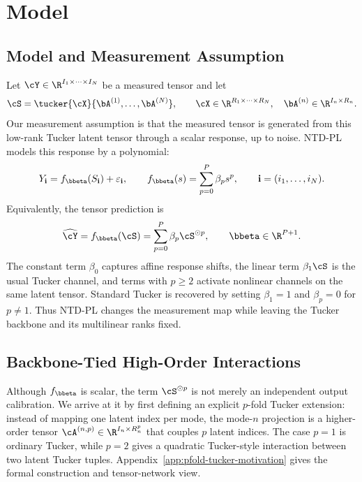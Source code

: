 \section{Model}
\label{sec:model}

\subsection{Model and Measurement Assumption}

Let \(\cY \in \R^{I_1 \times \cdots \times I_N}\) be a measured tensor and let
\begin{equation}
  \cS =
  \tucker{\cX}{\bA^{(1)}, \ldots, \bA^{(N)}},
  \qquad
  \cX \in \R^{R_1 \times \cdots \times R_N},
  \quad
  \bA^{(n)} \in \R^{I_n \times R_n}.
\end{equation}
Our measurement assumption is that the measured tensor is generated from this
low-rank Tucker latent tensor through a scalar response, up to noise. NTD-PL
models this response by a polynomial:
\begin{equation}
  Y_{\mathbf i}
  =
  f_{\bbeta}(S_{\mathbf i})+\varepsilon_{\mathbf i},
  \qquad
  f_{\bbeta}(s)=\sum_{p=0}^{P}\beta_p s^p,
  \qquad
  \mathbf i=(i_1,\ldots,i_N).
\end{equation}
Equivalently, the tensor prediction is
\begin{equation}
  \widehat{\cY}
  =
  f_{\bbeta}(\cS)
  =
  \sum_{p=0}^{P} \beta_p \cS^{\odot p},
  \qquad
  \bbeta \in \R^{P+1}.
\end{equation}
The constant term \(\beta_0\) captures affine response shifts, the linear term
\(\beta_1\cS\) is the usual Tucker channel, and terms with \(p\ge2\) activate
nonlinear channels on the same latent tensor. Standard Tucker is recovered by
setting \(\beta_1=1\) and \(\beta_p=0\) for \(p\neq 1\). Thus NTD-PL changes
the measurement map while leaving the Tucker backbone and its
multilinear ranks fixed.

\subsection{Backbone-Tied High-Order Interactions}
\label{sec:shared-backbone-interactions}

Although \(f_{\bbeta}\) is scalar, the term \(\cS^{\odot p}\) is not merely an
independent output calibration. We arrive at it by first defining an explicit
\(p\)-fold Tucker extension: instead of mapping one latent index per mode, the
mode-\(n\) projection is a higher-order tensor
\(\cA^{(n,p)}\in\R^{I_n\times R_n^p}\) that couples \(p\) latent indices. The
case \(p=1\) is ordinary Tucker, while \(p=2\) gives a quadratic Tucker-style
interaction between two latent Tucker tuples. Appendix~\ref{app:pfold-tucker-motivation}
gives the formal construction and tensor-network view.

